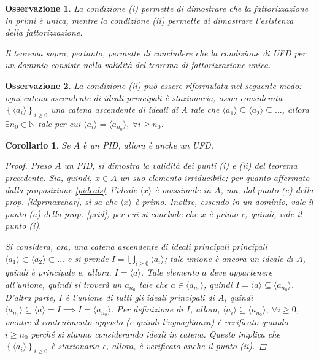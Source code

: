 \documentclass[12pt]{scrartcl}
\theoremstyle{style}
\newtheorem{corollario}{Corollario}[teorema]
\newtheorem{osservazione}{Osservazione}[section]
\numberwithin{equation}{subsection}
\begin{document}
\begin{osservazione}
La condizione (i) permette di dimostrare che la fattorizzazione in primi \`e unica, mentre la condizione (ii) permette di dimostrare l'esistenza della fattorizzazione.

Il teorema sopra, pertanto, permette di concludere che la condizione di UFD per un dominio consiste nella validit\`a del teorema di fattorizzazione unica.
\end{osservazione}
\begin{osservazione}
La condizione (ii) pu\`o essere riformulata nel seguente modo: ogni catena ascendente di ideali principali \`e stazionaria, ossia considerata $\left\{ \langle a_i \rangle \right\} _{i\ge 0} $ una catena ascendente di ideali di $A$ tale che $\langle a_1 \rangle\subseteq \langle a_2 \rangle\subseteq \ldots$, allora $\exists n_0 \in \mathbb{N}$ tale per cui $\langle a_i \rangle= \langle a_{n_0}  \rangle, \ \forall i\ge n_0$.
\end{osservazione}
\begin{corollario}
	Se $A$ \`e un PID, allora \`e anche un UFD.
	\begin{proof}
		Preso $A$ un PID, si dimostra la validit\`a dei punti (i) e (ii) del teorema precedente.
		Sia, quindi, $x \in A$ un suo elemento irriducibile; per quanto affermato dalla proposizione \ref{pideals}, l'ideale $\langle x \rangle$ \`e massimale in $A$, ma, dal punto (e) della prop. \ref{idprmaxchar}, si sa che $\langle x \rangle$ \`e primo.
		Inoltre, essendo in un dominio, vale il punto (a) della prop. \ref{prid}, per cui si conclude che $x$ \`e primo e, quindi, vale il punto (i).

		Si considera, ora, una catena ascendente di ideali principali principali $\langle a_1 \rangle\subset \langle a_2 \rangle\subset \ldots$ e si prende $I = \bigcup _{i\ge 0} \langle a_i \rangle$; tale unione \`e ancora un ideale di $A$, quindi \`e principale e, allora, $I = \langle a \rangle$.
		Tale elemento $a$ deve appartenere all'unione, quindi si trover\`a un $a_{n_0} $ tale che $a \in \langle a_{n_0}  \rangle$, quindi $I = \langle a \rangle\subseteq \langle a_{n_0}  \rangle$.
		D'altra parte, $I$ \`e l'unione di tutti gli ideali principali di $A$, quindi $\langle a_{n_0}  \rangle\subseteq \langle a \rangle= I \implies I = \langle a_{n_0}  \rangle$.
		Per definizione di $I$, allora, $\langle a_i \rangle\subseteq \langle a_{n_0}  \rangle, \ \forall i\ge 0$, mentre il contenimento opposto (e quindi l'uguaglianza) \`e verificato quando $i\ge n_0$ perch\'e si stanno considerando ideali in catena.
		Questo implica che $\left\{ \langle a_i \rangle \right\} _{i\ge 0} $ \`e stazionaria e, allora, \`e verificato anche il punto (ii).
	\end{proof}
\end{corollario}
\end{document}
